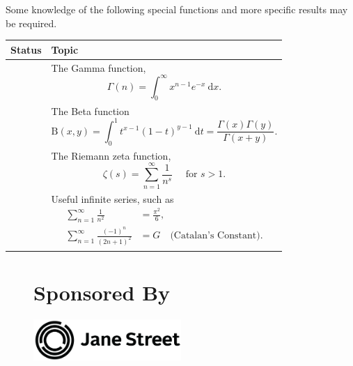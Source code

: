 \documentclass[11pt]{scrartcl}
\providecommand{\isRq}{{\color{green!60!black}\CheckmarkBold}}
\begin{document}
Some knowledge of the following special functions and more specific results may be required. 

\begin{center}
	\begin{tabular}{cp{12cm}}
	\toprule Status & Topic \\ \midrule
	\isRq & The Gamma function,
	$$
	\Gamma(n)=\int_{0}^{\infty} x^{n-1} e^{-x} \mathrm{~d} x.
	$$\\
	\isRq & The Beta function
	$$
	\mathrm{B}(x, y)=\int_{0}^{1} t^{x-1}(1-t)^{y-1} \mathrm{~d} t=\frac{\Gamma(x) \Gamma(y)}{\Gamma(x+y)}.
	$$
	\\
	\isRq & The Riemann zeta function,
	$$
	\zeta(s)=\sum_{n=1}^{\infty} \frac{1}{n^{s}} \quad \text { for } s>1.
	$$\\
	\isRq & Useful infinite series, such as
	$$
	\begin{aligned}
		\sum_{n = 1}^{\infty} \frac{1}{n^2} &= \frac{\pi^2}{6}, \\
		\sum_{n = 1}^{\infty} \frac{(-1)^n}{(2n + 1)^2} &= G \quad \text{(Catalan's Constant).}
	\end{aligned}
	$$
	\\
	\bottomrule
	\end{tabular}
\end{center}


\begin{figure}[!b]
	\centering
	\section*{\centering Sponsored By}
	

	\includegraphics[width=0.5\textwidth]{jslogo.png}
\end{figure}
\end{document}
